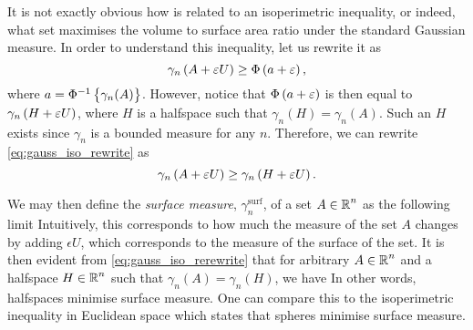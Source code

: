 \documentclass[../main.tex]{subfiles}
\begin{document}
It is not exactly obvious how  is related to an isoperimetric inequality, or indeed, what set maximises the volume to surface area ratio under the standard Gaussian measure. In order to understand this inequality, let us rewrite it as 
\begin{equation}
    \label{eq:gauss_iso_rewrite}
    \gamma_n\del{A + \epsilon U}\geq\Phi\del{a + \epsilon},
\end{equation}
where $a = \Phi^{-1}\cbr{\gamma_n(A)}$. However, notice that $\Phi\del{a + \epsilon}$ is then equal to $\gamma_n\del{H + \epsilon U}$, where $H$ is a halfspace such that $\gamma_n(H) = \gamma_n(A)$. Such an $H$ exists since $\gamma_n$ is a bounded measure for any $n$. Therefore, we can rewrite \eqref{eq:gauss_iso_rewrite} as 
\begin{equation}
    \label{eq:gauss_iso_rerewrite}
    \gamma_n\del{A + \epsilon U}\geq\gamma_n\del{H + \epsilon U}.
\end{equation}

We may then define the \emph{surface measure}, $\gamma_n^\text{surf}$, of a set $A\in\operatorname{\mathbb{R}}^n$ as the following limit  Intuitively, this corresponds to how much the measure of the set $A$ changes by adding $\epsilon U$, which corresponds to the measure of the surface of the set. It is then evident from \eqref{eq:gauss_iso_rerewrite} that for arbitrary $A\in\operatorname{\mathbb{R}}^n$ and a halfspace $H\in\operatorname{\mathbb{R}}^n$ such that $\gamma_n(A) = \gamma_n(H)$, we have  In other words, halfspaces minimise surface measure. One can compare this to the isoperimetric inequality in Euclidean space which states that spheres minimise surface measure.
\end{document}
